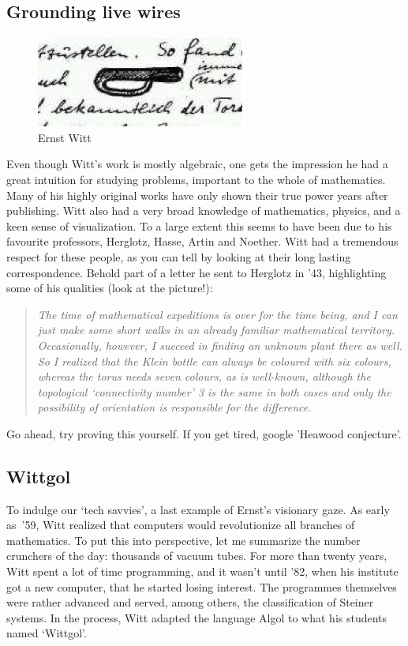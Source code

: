 \subsection{Grounding live wires}
\begin{figure}
  \centering
  \includegraphics[width=.3\textwidth]{playing-witt-rings/klein}
  \caption{Ernst Witt}
\end{figure}
Even though Witt's work is mostly algebraic, one gets the impression he had a great intuition for studying problems, important to the whole of mathematics. Many of his highly original works have only shown their true power years after publishing. Witt also had a very broad knowledge of mathematics, physics, and a keen sense of visualization. To a large extent this seems to have been due to his favourite professors, Herglotz, Hasse, Artin and Noether. Witt had a tremendous respect for these people, as you can tell by looking at their long lasting correspondence. Behold part of a letter he sent to Herglotz in '43, highlighting some of his qualities (look at the picture!):
\begin{quote}
  \textsl{The time of mathematical expeditions is over for the time being, and I can just make some short walks in an already familiar mathematical territory. Occasionally, however, I succeed in finding an unknown plant there as well. So I realized that the Klein bottle can always be coloured with six colours, whereas the torus needs seven colours, as is well-known, although the topological `connectivity number' 3 is the same in both cases and only the possibility of orientation is responsible for the difference.}
\end{quote}
Go ahead, try proving this yourself. If you get tired, google 'Heawood conjecture'.


\subsection{Wittgol}
To indulge our `tech savvies', a last example of Ernst's visionary gaze. As early as~'59, Witt realized that computers would revolutionize all branches of mathematics. To put this into perspective, let me summarize the number crunchers of the day: thousands of vacuum tubes. For more than twenty years, Witt spent a lot of time programming, and it wasn't until '82, when his institute got a new computer, that he started losing interest. The programmes themselves were rather advanced and served, among others, the classification of Steiner systems. In the process, Witt adapted the language Algol to what his students named `Wittgol'.

